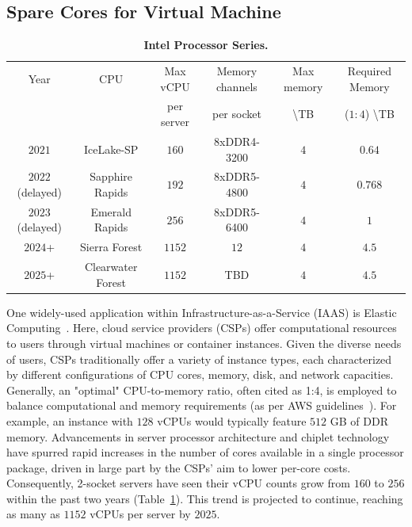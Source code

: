 \subsection{Spare Cores for Virtual Machine}

\begin{table}[!]
  \centering
  \small
  \begin{tabular}{c|c|c|c|c|c} 
        \hline
        Year & CPU & Max vCPU  & Memory channels & Max memory & Required Memory \\
        & & per server & per socket & \textbackslash TB & ($1:4$) \textbackslash TB\\\hline
        $2021$ & IceLake-SP\cite{icelakecores} & $160$ & 8xDDR4-3200 & $4$ & $0.64$ \\\hline
        $2022$ (delayed) & Sapphire Rapids\cite{sprcores} & $192$ & 8xDDR5-4800 & 	$4$ & $0.768$ \\\hline
        $2023$ (delayed) & Emerald Rapids\cite{emeraldrapidscores} & $256$ & 8xDDR5-6400 & $4$ & $1$ \\\hline
        $2024$+  & Sierra Forest\cite{sierraforestcores} & $1152$ & $12$ & $4$ & $4.5$ \\\hline
        $2025$+ & Clearwater Forest\cite{clearwatercores} & $1152$ & TBD & $4$ & $4.5$ \\\hline
  \end{tabular}
  \caption{\textbf{Intel Processor Series.} }
  \label{tab:amd}
  \vspace{-1.5em}
\end{table}

One widely-used application within Infrastructure-as-a-Service (IAAS) is Elastic Computing~\cite{elasticcomputing}. Here, cloud service providers (CSPs) offer computational resources to users through virtual machines or container instances. Given the diverse needs of users, CSPs traditionally offer a variety of instance types, each characterized by different configurations of CPU cores, memory, disk, and network capacities. Generally, an "optimal" CPU-to-memory ratio, often cited as 1:4, is employed to balance computational and memory requirements (as per AWS guidelines~\cite{awsm7a, awsm7i}). For example, an instance with $128$ vCPUs would typically feature $512$ GB of DDR memory.
Advancements in server processor architecture and chiplet technology have spurred rapid increases in the number of cores available in a single processor package, driven in large part by the CSPs' aim to lower per-core costs. Consequently, 2-socket servers have seen their vCPU counts grow from $160$ to $256$ within the past two years (Table~\ref{tab:amd}). This trend is projected to continue, reaching as many as $1152$ vCPUs per server by $2025$.



